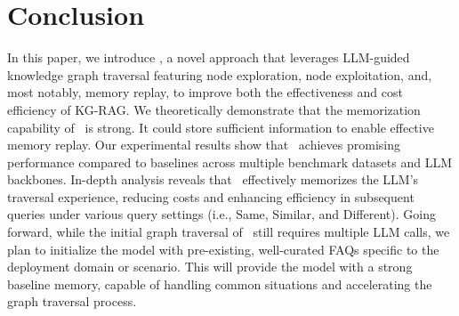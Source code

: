 \section{Conclusion}

In this paper, we introduce \ours, a novel approach that leverages LLM-guided knowledge graph traversal featuring node exploration, node exploitation, and, most notably, memory replay, to improve both the effectiveness and cost efficiency of KG-RAG. We theoretically demonstrate that the memorization capability of \ours~is strong. It could store sufficient information to enable effective memory replay. Our experimental results show that \ours~achieves promising performance compared to baselines across multiple benchmark datasets and LLM backbones. In-depth analysis reveals that \ours~effectively memorizes the LLM's traversal experience, reducing costs and enhancing efficiency in subsequent queries under various query settings (i.e., Same, Similar, and Different). Going forward, while the initial graph traversal of \ours~still requires multiple LLM calls, we plan to initialize the model with pre-existing, well-curated FAQs specific to the deployment domain or scenario. This will provide the model with a strong baseline memory, capable of handling common situations and accelerating the graph traversal process.
